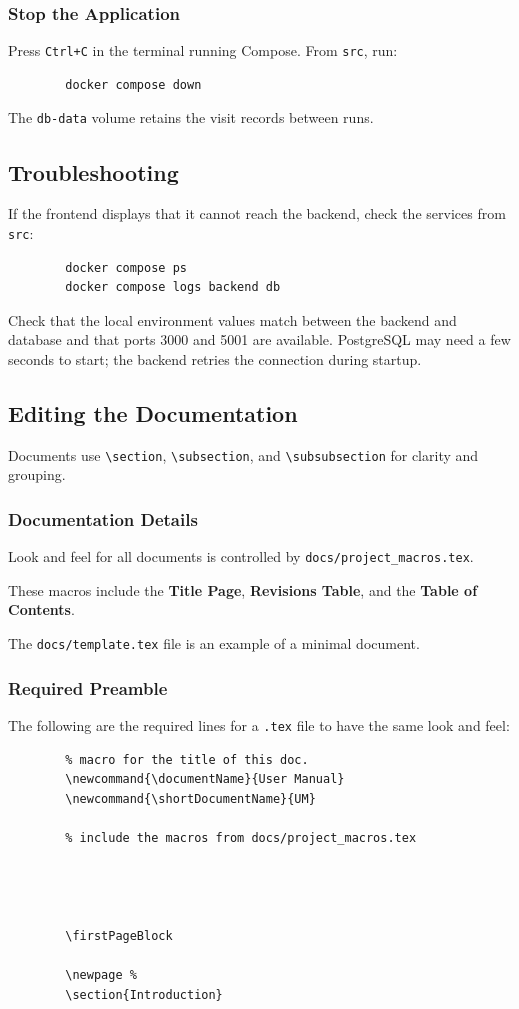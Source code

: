	\subsubsection{Stop the Application}
		Press \texttt{Ctrl+C} in the terminal running Compose. From \texttt{src}, run:
		\begin{verbatim}
		docker compose down
		\end{verbatim}
		The \texttt{db-data} volume retains the visit records between runs.

	\subsection{Troubleshooting}
		If the frontend displays that it cannot reach the backend, check the services from \texttt{src}:
		\begin{verbatim}
		docker compose ps
		docker compose logs backend db
		\end{verbatim}
		Check that the local environment values match between the backend and database and that ports 3000 and 5001 are available. PostgreSQL may need a few seconds to start; the backend retries the connection during startup.

\newpage %
\subsection{Editing the Documentation}
Documents use \texttt{\textbackslash section}, \texttt{\textbackslash subsection}, and \texttt{\textbackslash subsubsection} for clarity and grouping.

\subsubsection{Documentation Details}
	Look and feel for all documents is controlled by \texttt{docs/project\_macros.tex}.

	These macros include the \textbf{Title Page}, \textbf{Revisions Table}, and the \textbf{Table of Contents}.

	The \texttt{docs/template.tex} file is an example of a minimal document.

\subsubsection{Required Preamble}
The following are the required lines for a \texttt{.tex} file to have the same look and feel:
	\begin{verbatim}
		% macro for the title of this doc.
		\newcommand{\documentName}{User Manual}
		\newcommand{\shortDocumentName}{UM}

		% include the macros from docs/project_macros.tex
		

		

		\firstPageBlock

		\newpage %
		\section{Introduction}
	\end{verbatim}

